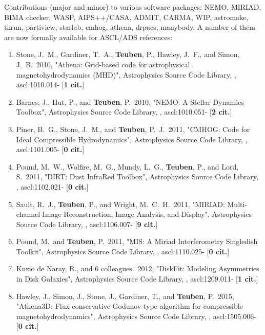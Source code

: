 \documentclass[11pt,letterpaper]{article}
\begin{document}
Contributions (major and minor) to various software packages: NEMO,
MIRIAD, BIMA checker, WASP, AIPS++/CASA, ADMIT, CARMA, WIP, astromake,
tkrun, partiview, starlab, cmhog, athena, drpacs, manybody. A number of
them are now formally available for ASCL/ADS references:

\begin{enumerate}[resume,label=\textbf{\arabic*}.]


\item  
Stone, J.~M., Gardiner, T.~A., {\bf Teuben}, P., Hawley, J.~F., and Simon, 
J.~B.\  2010,  "Athena: Grid-based code for astrophysical 
magnetohydrodynamics (MHD)", Astrophysics Source Code Library,  , 
ascl:1010.014- [{\bf 1 cit.}]

\item  
Barnes, J., Hut, P., and {\bf Teuben}, P.\  2010,  "NEMO: A Stellar Dynamics 
Toolbox", Astrophysics Source Code Library,  , ascl:1010.051- [{\bf 2 
cit.}] 

\item  
Piner, B.~G., Stone, J.~M., and {\bf Teuben}, P.~J.\  2011,  "CMHOG: Code for 
Ideal Compressible Hydrodynamics", Astrophysics Source Code Library,  , 
ascl:1101.005- [{\bf 0 cit.}]

\item  
Pound, M.~W., Wolfire, M.~G., Mundy, L.~G., {\bf Teuben}, P., and Lord, S.\  
2011,  "DIRT: Dust InfraRed Toolbox", Astrophysics Source Code Library,  , 
ascl:1102.021- [{\bf 0 cit.}] 
\item  
Sault, R.~J., {\bf Teuben}, P., and Wright, M.~C.~H.\  2011,  "MIRIAD: 
Multi-channel Image Reconstruction, Image Analysis, and Display", 
Astrophysics Source Code Library,  , ascl:1106.007- [{\bf 9 cit.}] 
\item  
Pound, M.~and {\bf Teuben}, P.\  2011,  "MIS: A Miriad Interferometry Singledish 
Toolkit", Astrophysics Source Code Library,  , ascl:1110.025- [{\bf 0 
cit.}] 
\item  
Kuzio de Naray, R., and 6 colleagues.\  2012,  "DiskFit: Modeling 
Asymmetries in Disk Galaxies", Astrophysics Source Code Library,  , 
ascl:1209.011- [{\bf 1 cit.}] 
\item  
Hawley, J., Simon, J., Stone, J., Gardiner, T., and {\bf Teuben}, P.\  2015,  
"Athena3D: Flux-conservative Godunov-type algorithm for compressible 
magnetohydrodynamics", Astrophysics Source Code Library,  , ascl:1505.006- 
[{\bf 0 cit.}] 


  
\end{enumerate}
\end{document}
